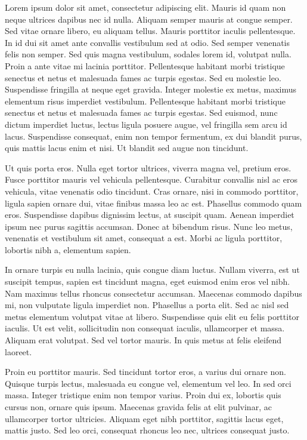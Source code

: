 \documentclass[a4paper,15pt]{article}
\begin{document}
Lorem ipsum dolor sit amet, consectetur adipiscing elit. Mauris id quam non neque ultrices dapibus nec id nulla. Aliquam semper mauris at congue semper. Sed vitae ornare libero, eu aliquam tellus. Mauris porttitor iaculis pellentesque. In id dui sit amet ante convallis vestibulum sed at odio. Sed semper venenatis felis non semper. Sed quis magna vestibulum, sodales lorem id, volutpat nulla. Proin a ante vitae mi lacinia porttitor. Pellentesque habitant morbi tristique senectus et netus et malesuada fames ac turpis egestas. Sed eu molestie leo. Suspendisse fringilla at neque eget gravida. Integer molestie ex metus, maximus elementum risus imperdiet vestibulum. Pellentesque habitant morbi tristique senectus et netus et malesuada fames ac turpis egestas. Sed euismod, nunc dictum imperdiet luctus, lectus ligula posuere augue, vel fringilla sem arcu id lacus. Suspendisse consequat, enim non tempor fermentum, ex dui blandit purus, quis mattis lacus enim et nisi. Ut blandit sed augue non tincidunt.

Ut quis porta eros. Nulla eget tortor ultrices, viverra magna vel, pretium eros. Fusce porttitor mauris vel vehicula pellentesque. Curabitur convallis nisl ac eros vehicula, vitae venenatis odio tincidunt. Cras ornare, nisi in commodo porttitor, ligula sapien ornare dui, vitae finibus massa leo ac est. Phasellus commodo quam eros. Suspendisse dapibus dignissim lectus, at suscipit quam. Aenean imperdiet ipsum nec purus sagittis accumsan. Donec at bibendum risus. Nunc leo metus, venenatis et vestibulum sit amet, consequat a est. Morbi ac ligula porttitor, lobortis nibh a, elementum sapien.

In ornare turpis eu nulla lacinia, quis congue diam luctus. Nullam viverra, est ut suscipit tempus, sapien est tincidunt magna, eget euismod enim eros vel nibh. Nam maximus tellus rhoncus consectetur accumsan. Maecenas commodo dapibus mi, non vulputate ligula imperdiet non. Phasellus a porta elit. Sed ac nisl sed metus elementum volutpat vitae at libero. Suspendisse quis elit eu felis porttitor iaculis. Ut est velit, sollicitudin non consequat iaculis, ullamcorper et massa. Aliquam erat volutpat. Sed vel tortor mauris. In quis metus at felis eleifend laoreet.

Proin eu porttitor mauris. Sed tincidunt tortor eros, a varius dui ornare non. Quisque turpis lectus, malesuada eu congue vel, elementum vel leo. In sed orci massa. Integer tristique enim non tempor varius. Proin dui ex, lobortis quis cursus non, ornare quis ipsum. Maecenas gravida felis at elit pulvinar, ac ullamcorper tortor ultricies. Aliquam eget nibh porttitor, sagittis lacus eget, mattis justo. Sed leo orci, consequat rhoncus leo nec, ultrices consequat justo.
\end{document}
